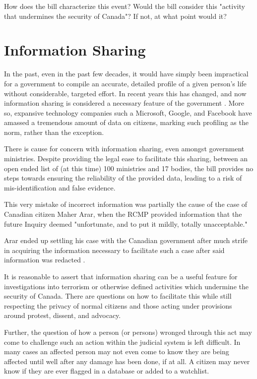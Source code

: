 \documentclass[a4paper, 11pt]{article} %
\begin{document}
How does the bill characterize this event? Would the bill consider this "activity that undermines the security of Canada"? If not, at what point would it?

\section*{Information Sharing}
In the past, even in the past few decades, it would have simply been impractical for a government to compile an accurate, detailed profile of a given person's life without considerable, targeted effort. In recent years this has changed, and now information sharing is considered a necessary feature of the government \cite{total-awareness}. More so, expansive technology companies such a Microsoft, Google, and Facebook have amassed a tremendous amount of data on citizens, marking such profiling as the norm, rather than the exception.

There is cause for concern with information sharing, even amongst government ministries. Despite providing the legal ease to facilitate this sharing, between an open ended list of (at this time) 100 ministries and 17 bodies, the bill provides no steps towards ensuring the reliability of the provided data, leading to a risk of mis-identification and false evidence.

This very mistake of incorrect information was partially the cause of the case of Canadian citizen Maher Arar, when the RCMP provided information that the future Inquiry deemed "unfortunate, and to put it mildly, totally unacceptable." \cite{arar}

Arar ended up settling his case with the Canadian government after much strife in acquiring the information necessary to facilitate such a case after said information was redacted \cite{arar_canada_2007}.

It is reasonable to assert that information sharing can be a useful feature for investigations into terrorism or otherwise defined activities which undermine the security of Canada. There are questions on how to facilitate this while still respecting the privacy of normal citizens and those acting under provisions around protest, dissent, and advocacy.

Further, the question of how a person (or persons) wronged through this act may come to challenge such an action within the judicial system is left difficult. In many cases an affected person may not even come to know they are being affected until well after any damage has been done, if at all. A citizen may never know if they are ever flagged in a database or added to a watchlist.
\end{document}
